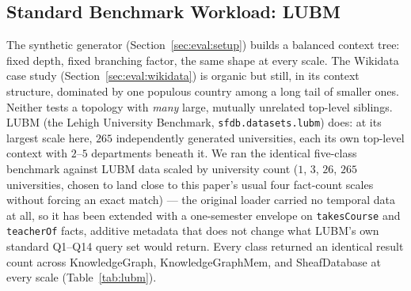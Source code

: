 \subsection{Standard Benchmark Workload: LUBM}
\label{sec:eval:lubm}

The synthetic generator (Section~\ref{sec:eval:setup}) builds a
balanced context tree: fixed depth, fixed branching factor, the same
shape at every scale. The Wikidata case study
(Section~\ref{sec:eval:wikidata}) is organic but still, in its context
structure, dominated by one populous country among a long tail of
smaller ones. Neither tests a topology with \emph{many} large, mutually
unrelated top-level siblings. LUBM (the Lehigh University Benchmark,
\texttt{sfdb.datasets.lubm})
does: at its largest scale here, $265$ independently generated
universities, each its own top-level context with $2$--$5$ departments
beneath it. We ran the identical five-class benchmark against LUBM data
scaled by university count ($1$, $3$, $26$, $265$ universities, chosen
to land close to this paper's usual four fact-count scales without
forcing an exact match) --- the original loader carried no temporal
data at all, so it has been extended with a one-semester envelope on
\texttt{takesCourse} and \texttt{teacherOf} facts, additive metadata
that does not change what LUBM's own standard Q1--Q14 query set would
return. Every class returned an identical result count across
KnowledgeGraph, KnowledgeGraphMem, and SheafDatabase at every scale
(Table~\ref{tab:lubm}).



